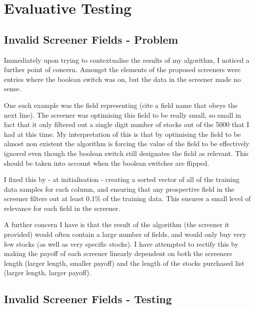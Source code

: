 \section{Evaluative Testing}
\subsection{Invalid Screener Fields - Problem}
Immediately upon trying to contextualise the results of my algorithm, I noticed a further point of concern. Amongst the elements of the proposed screeners were entries where the boolean switch was on, but the data in the screener made no sense. \newline

One such example was the field representing (cite a field name that obeys the next line). The screener was optimising this field to be really small, so small in fact that it only filtered out a single digit number of stocks out of the 5000 that I had at this time. My interpretation of this is that by optimising the field to be almost non existent the algorithm is forcing the value of the field to be effectively ignored even though the boolean switch still designates the field as relevant. This should be taken into account when the boolean switches are flipped. \newline

I fixed this by - at initialisation - creating a sorted vector of all of the training data samples for each column, and ensuring that any prospective field in the screener filters out at least 0.1\% of the training data. This ensures a small level of relevance for each field in the screener. \newline

A further concern I have is that the result of the algorithm (the screener it provided) would often contain a large number of fields, and would only buy very few stocks (as well as very specific stocks). I have attempted to rectify this by making the payoff of each screener linearly dependent on both the screeners length (larger length, smaller payoff) and the length of the stocks purchased list (larger length, larger payoff).

\subsection{Invalid Screener Fields - Testing}
